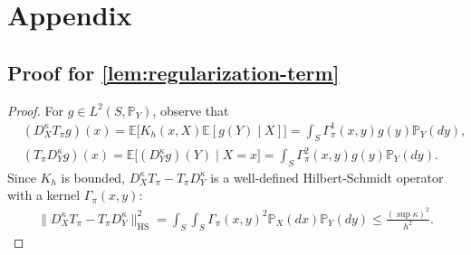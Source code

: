 \documentclass{article}
\begin{document}
\appendix
\section{Appendix}
\subsection{Proof for \cref{lem:regularization-term}}\label{pf:lem:regularization-term}
\begin{proof}
	For $g \in L^2(S,\mathbb{P}_Y)$, observe that
	\begin{align*}
		&(D_X^{\kappa}T_{\pi}g)(x) = \mathbb{E}\Big[K_h(x,X)\mathbb{E}\left[g(Y) \mid X\right]\Big] = \int_S \Gamma_\pi^1(x,y)g(y)\mathbb{P}_Y(dy) , \\
		&(T_{\pi}D_Y^{\kappa}g)(x) = \mathbb{E}\Big[(D_Y^{\kappa}g)(Y) \mid X = x\Big] = \int_S \Gamma_\pi^2(x,y)g(y) \mathbb{P}_Y(dy) .
	\end{align*}
	Since $K_h$ is bounded, $D_X^{\kappa}T_{\pi} - T_{\pi}D_Y^{\kappa}$ is a well-defined Hilbert-Schmidt operator with a kernel $\Gamma_\pi(x,y)$:
	\begin{align*}
		\| D_X^{\kappa}T_{\pi} - T_{\pi}D_Y^{\kappa} \|_{\mathrm{HS}}^2 = \int_S\int_S \Gamma_\pi(x,y)^2\mathbb{P}_X(dx)\mathbb{P}_Y(dy) \leq \frac{(\sup\kappa)^2}{h^2} .
	\end{align*}
\end{proof}
\end{document}
